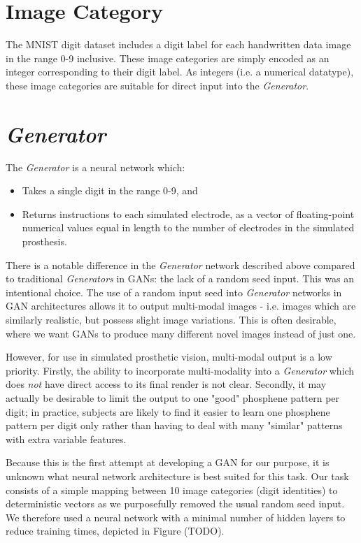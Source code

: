 \documentclass[a4paper,11pt,openany]{book}
\begin{document}
\section*{Image Category}
\label{sec:org15ec6fd}

The MNIST digit dataset includes a digit label for each handwritten data image in the range 0-9 inclusive.
These image categories are simply encoded as an integer corresponding to their digit label.
As integers (i.e. a numerical datatype), these image categories are suitable for direct input into the \emph{Generator}.

\section*{\emph{Generator}}
\label{sec:orged26344}

The \emph{Generator} is a neural network which:

\begin{itemize}
\item Takes a single digit in the range 0-9, and
\item Returns instructions to each simulated electrode, as a vector of floating-point numerical values equal in length to the number of electrodes in the simulated prosthesis.
\end{itemize}

There is a notable difference in the \emph{Generator} network described above compared to traditional \emph{Generators} in GANs: the lack of a random seed input.
This was an intentional choice.
The use of a random input seed into \emph{Generator} networks in GAN architectures allows it to output multi-modal images - i.e. images which are similarly realistic, but possess slight image variations.
This is often desirable, where we want GANs to produce many different novel images instead of just one.

However, for use in simulated prosthetic vision, multi-modal output is a low priority.
Firstly, the ability to incorporate multi-modality into a \emph{Generator} which does \emph{not} have direct access to its final render is not clear.
Secondly, it may actually be desirable to limit the output to one "good" phosphene pattern per digit; in practice, subjects are likely to find it easier to learn one phosphene pattern per digit only rather than having to deal with many "similar" patterns with extra variable features.

Because this is the first attempt at developing a GAN for our purpose, it is unknown what neural network architecture is best suited for this task.
Our task consists of a simple mapping between 10 image categories (digit identities) to deterministic vectors as we purposefully removed the usual random seed input.
We therefore used a neural network with a minimal number of hidden layers to reduce training times, depicted in Figure (TODO).
\end{document}
